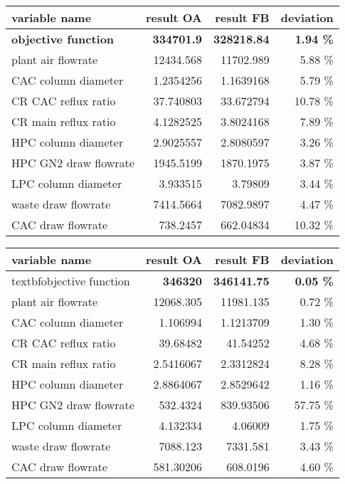 \begin{minipage}{\linewidth}
    \center
    \footnotesize
    \begin{tabular}{lrrr}
        \hline variable name & result OA & result FB & deviation \\ \hline 
        \textbf{objective function} & \textbf{334701.9} & \textbf{328218.84} & \textbf{1.94 \%} \\
        plant air flowrate & 12434.568 & 11702.989 & 5.88 \% \\
        CAC column diameter & 1.2354256 & 1.1639168 & 5.79 \% \\
        CR CAC reflux ratio & 37.740803 & 33.672794 & 10.78 \% \\
        CR main reflux ratio & 4.1282525 & 3.8024168 & 7.89 \% \\
        HPC column diameter & 2.9025557 & 2.8080597 & 3.26 \% \\
        HPC GN2 draw flowrate & 1945.5199 & 1870.1975 & 3.87 \% \\
        LPC column diameter & 3.933515 & 3.79809 & 3.44 \% \\
        waste draw flowrate & 7414.5664 & 7082.9897 & 4.47 \% \\
        CAC draw flowrate & 738.2457 & 662.04834 & 10.32 \% \\ \hline
    \end{tabular}
\end{minipage}

\begin{minipage}{\linewidth}
    \center
    \footnotesize
    \begin{tabular}{lrrr}
        \hline variable name & result OA & result FB & deviation \\ \hline 
        textbf{objective function} & \textbf{346320} & \textbf{346141.75} & \textbf{0.05 \%} \\
        plant air flowrate & 12068.305 & 11981.135 & 0.72 \% \\
        CAC column diameter & 1.106994 & 1.1213709 & 1.30 \% \\
        CR CAC reflux ratio & 39.68482 & 41.54252 & 4.68 \% \\
        CR main reflux ratio & 2.5416067 & 2.3312824 & 8.28 \% \\
        HPC column diameter & 2.8864067 & 2.8529642 & 1.16 \% \\
        HPC GN2 draw flowrate & 532.4324 & 839.93506 & 57.75 \% \\
        LPC column diameter & 4.132334 & 4.06009 & 1.75 \% \\
        waste draw flowrate & 7088.123 & 7331.581 & 3.43 \% \\
        CAC draw flowrate & 581.30206 & 608.0196 & 4.60 \% \\ \hline
    \end{tabular}
\end{minipage}

